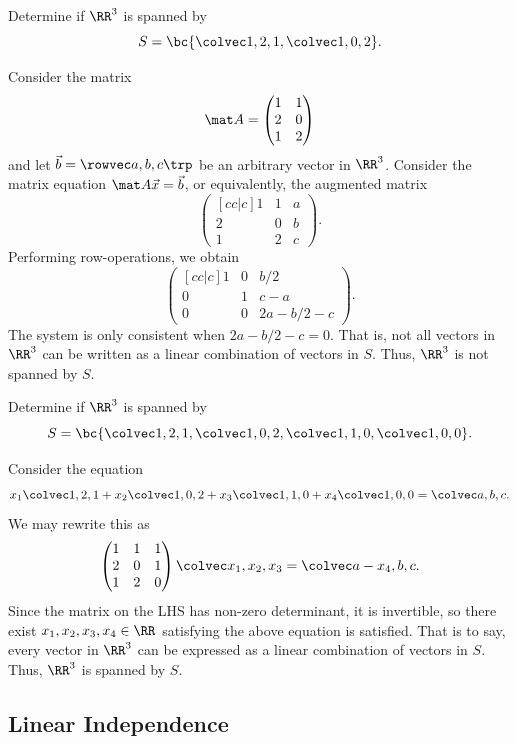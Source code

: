 \begin{sample}
    Determine if $\RR^3$ is spanned by \[S = \bc{\cveciii121, \cveciii102}.\]
\end{sample}
\begin{sampans}
    Consider the matrix \[\mat A = \begin{pmatrix}1 & 1 \\ 2 & 0 \\ 1 & 2\end{pmatrix}\] and let $\vec b = \cveciiix{a}{b}{c}$ be an arbitrary vector in $\RR^3$. Consider the matrix equation $\mat A \vec x = \vec b$, or equivalently, the augmented matrix \[\begin{pmatrix}[cc|c]1 & 1 & a \\ 2 & 0 & b\\ 1 & 2 & c\end{pmatrix}.\] Performing row-operations, we obtain \[\begin{pmatrix}[cc|c]1 & 0 & b/2 \\ 0 & 1 & c-a \\ 0 & 0 & 2a - b/2 - c\end{pmatrix}.\] The system is only consistent when $2a - b/2 - c = 0$. That is, not all vectors in $\RR^3$ can be written as a linear combination of vectors in $S$. Thus, $\RR^3$ is not spanned by $S$.
\end{sampans}

\begin{sample}
    Determine if $\RR^3$ is spanned by \[S = \bc{\cveciii121, \cveciii102, \cveciii110, \cveciii100}.\]
\end{sample}
\begin{sampans}
    Consider the equation \[x_1 \cveciii121 + x_2 \cveciii102 + x_3 \cveciii110 + x_4 \cveciii100 = \cveciii{a}{b}{c}.\] We may rewrite this as \[\begin{pmatrix}1 & 1 & 1 \\ 2 & 0 & 1 \\ 1 & 2 & 0\end{pmatrix} \cveciii{x_1}{x_2}{x_3} = \cveciii{a-x_4}{b}{c}.\] Since the matrix on the LHS has non-zero determinant, it is invertible, so there exist $x_1, x_2, x_3, x_4 \in \RR$ satisfying the above equation is satisfied. That is to say, every vector in $\RR^3$ can be expressed as a linear combination of vectors in $S$. Thus, $\RR^3$ is spanned by $S$.
\end{sampans}

\subsection{Linear Independence}

